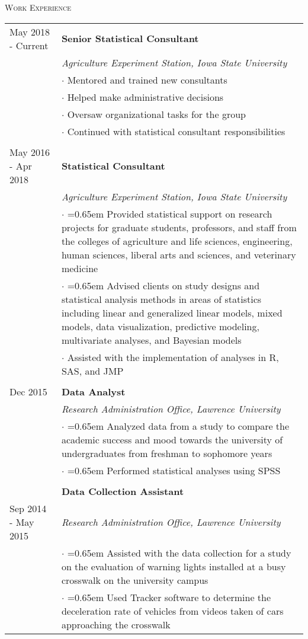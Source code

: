 \documentclass[10pt, oneside]{article}
\begin{document}
\noindent \textsc{Work Experience} \hrulefill
\begin{longtable}{p{3.5cm}p{13cm}}
\hfill{May 2018 - Current} & \textbf{Senior Statistical Consultant}\\
& \emph{Agriculture Experiment Station, Iowa State University} \vspace{0.1cm}\\
& $\cdot$ Mentored and trained new consultants\\
& $\cdot$ Helped make administrative decisions\\
& $\cdot$ Oversaw organizational tasks for the group\\
& $\cdot$ Continued with statistical consultant responsibilities\\
\\
\hfill{May 2016 - Apr 2018} & \textbf{Statistical Consultant}\\
& \emph{Agriculture Experiment Station, Iowa State University} \vspace{0.1cm}\\
& $\cdot$ \hangindent=0.65em \hangafter=1 Provided statistical support on research projects for graduate students, professors, and staff from the colleges of agriculture and life sciences, engineering, human sciences, liberal arts and sciences, and veterinary medicine\\
& $\cdot$ \hangindent=0.65em \hangafter=1 Advised clients on study designs and statistical analysis methods in areas of statistics including linear and generalized linear models, mixed models, data visualization, predictive modeling, multivariate analyses, and Bayesian models\\
& $\cdot$ Assisted with the implementation of analyses in R, SAS, and JMP\\
\\
\hfill{Dec 2015} & \textbf{Data Analyst}\\
& \emph{Research Administration Office, Lawrence University} \vspace{0.1cm}\\
& $\cdot$ \hangindent=0.65em \hangafter=1 Analyzed data from a study to compare the academic success and mood towards the university of undergraduates from freshman to sophomore years\\
& $\cdot$ \hangindent=0.65em \hangafter=1 Performed statistical analyses using SPSS\\
\\
& \textbf{Data Collection Assistant}\\
\hfill{Sep 2014 - May 2015} & \emph{Research Administration Office, Lawrence University} \vspace{0.1cm}\\
& $\cdot$ \hangindent=0.65em \hangafter=1 Assisted with the data collection for a study on the evaluation of warning lights installed at a busy crosswalk on the university campus\\
& $\cdot$ \hangindent=0.65em \hangafter=1 Used Tracker software to determine the deceleration rate of vehicles from videos taken of cars approaching the crosswalk
\end{longtable}
\end{document}
